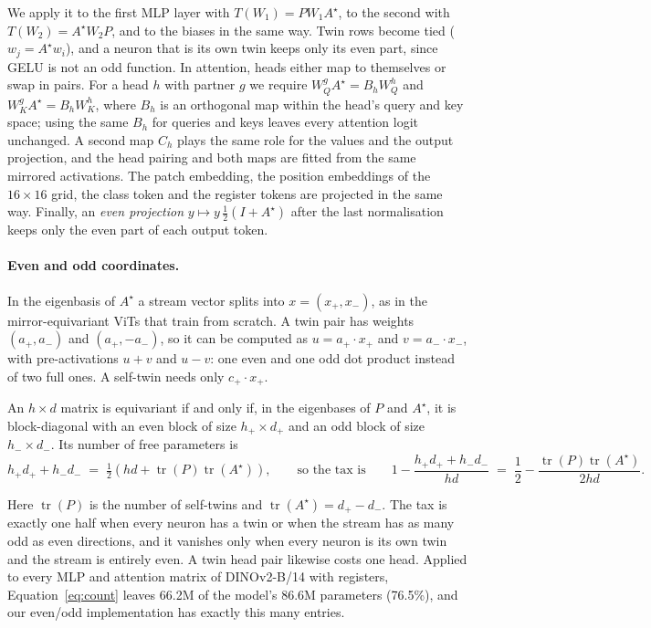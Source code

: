 We apply it to the first MLP layer with $T(W_1) = P W_1 A^\star$, to the second with $T(W_2) = A^\star W_2 P$, and to
the biases in the same way. Twin rows become tied ($w_j = A^\star w_i$), and a neuron that is its own twin keeps only
its even part, since GELU is not an odd function. In
attention, heads either map to themselves or swap in pairs. For a head $h$ with partner $g$ we require
$W_Q^{g} A^\star = B_h W_Q^{h}$ and $W_K^{g} A^\star = B_h W_K^{h}$, where $B_h$ is an orthogonal map within the head's
query and key space; using the same $B_h$ for queries and keys leaves every attention logit unchanged. A second map
$C_h$ plays the same role for the values and the output projection, and the head pairing and both maps are fitted from
the same mirrored activations. The patch embedding, the position embeddings of the $16\times16$ grid, the class token
and the register tokens are projected in the same way. Finally, an \emph{even projection}
$y \mapsto y\,\tfrac12(I + A^\star)$ after the last normalisation keeps only the even part of each output token.

\paragraph{Even and odd coordinates.}
In the eigenbasis of $A^\star$ a stream vector splits into $x = (x_+, x_-)$, as in the mirror-equivariant ViTs that
\citet{bokman2025flopping} train from scratch. A twin pair has weights $(a_+, a_-)$ and $(a_+, -a_-)$, so it can be
computed as $u = a_+ \cdot x_+$ and $v = a_- \cdot x_-$, with pre-activations $u+v$ and $u-v$: one even and one odd dot
product instead of two full ones. A self-twin needs only $c_+ \cdot x_+$.

\begin{proposition}\label{prop:count}
An $h\times d$ matrix is equivariant if and only if, in the eigenbases of $P$ and $A^\star$, it is block-diagonal with an
even block of size $h_+ \times d_+$ and an odd block of size $h_- \times d_-$. Its number of free parameters is
\begin{equation}
  h_+ d_+ + h_- d_- \;=\; \tfrac12 \left( h d + \operatorname{tr}(P)\operatorname{tr}(A^\star) \right),
  \qquad\text{so the tax is}\qquad
  1 - \frac{h_+ d_+ + h_- d_-}{hd} \;=\; \frac12 - \frac{\operatorname{tr}(P)\operatorname{tr}(A^\star)}{2hd}.
  \label{eq:count}
\end{equation}
\end{proposition}

Here $\operatorname{tr}(P)$ is the number of self-twins and $\operatorname{tr}(A^\star) = d_+ - d_-$. The tax is exactly one
half when every neuron has a twin or when the stream has as many odd as even directions, and it vanishes only when every
neuron is its own twin and the stream is entirely even. A twin head pair likewise costs one head. Applied to every MLP and
attention matrix of DINOv2-B/14 with registers, Equation~\eqref{eq:count} leaves 66.2M of the model's 86.6M parameters
(76.5\%), and our even/odd implementation has exactly this many entries.

